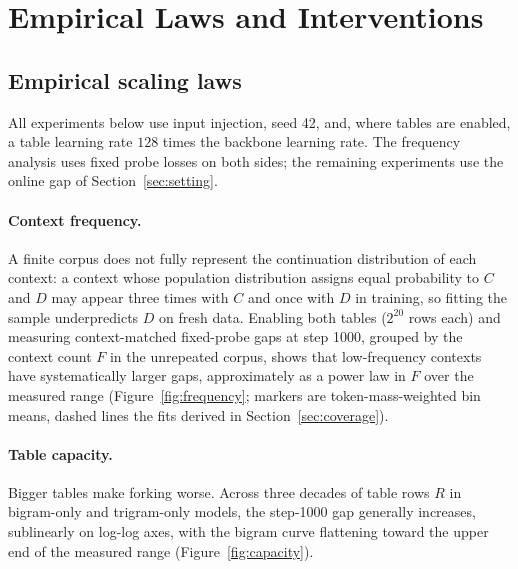 \section{Empirical Laws and Interventions}
\label{sec:empirical}

\subsection{Empirical scaling laws}
\label{sec:forking-factors}

All experiments below use input injection, seed 42, and, where tables are enabled, a table learning rate $128$ times the backbone learning rate. The frequency analysis uses fixed probe losses on both sides; the remaining experiments use the online gap of Section~\ref{sec:setting}.

\paragraph{Context frequency.}
A finite corpus does not fully represent the continuation distribution of each context: a context whose population distribution assigns equal probability to $C$ and $D$ may appear three times with $C$ and once with $D$ in training, so fitting the sample underpredicts $D$ on fresh data. Enabling both tables ($2^{20}$ rows each) and measuring context-matched fixed-probe gaps at step 1000, grouped by the context count $F$ in the unrepeated corpus, shows that low-frequency contexts have systematically larger gaps, approximately as a power law in $F$ over the measured range (Figure~\ref{fig:frequency}; markers are token-mass-weighted bin means, dashed lines the fits derived in Section~\ref{sec:coverage}).

\paragraph{Table capacity.}
Bigger tables make forking worse. Across three decades of table rows $R$ in bigram-only and trigram-only models, the step-1000 gap generally increases, sublinearly on log-log axes, with the bigram curve flattening toward the upper end of the measured range (Figure~\ref{fig:capacity}).

